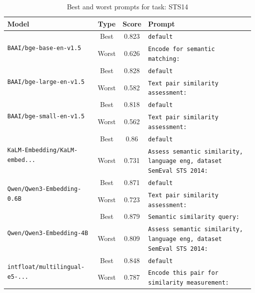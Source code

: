 \begin{table}[t]
\centering
\small
\caption{Best and worst prompts for task: STS14}
\begin{tabular}{|p{}|c|c|p{}|}
\hline
Model & Type & Score & Prompt \\
\hline
\multirow{2}{=}{\raggedright\texttt{BAAI/\allowbreak bge-\allowbreak base-\allowbreak en-\allowbreak v1.5}} & Best & 0.823 & \texttt{default} \\
\cline{2-4}
& Worst & 0.626 & \texttt{Encode for semantic matching:} \\
\hline
\multirow{2}{=}{\raggedright\texttt{BAAI/\allowbreak bge-\allowbreak large-\allowbreak en-\allowbreak v1.5}} & Best & 0.828 & \texttt{default} \\
\cline{2-4}
& Worst & 0.582 & \texttt{Text pair similarity assessment:} \\
\hline
\multirow{2}{=}{\raggedright\texttt{BAAI/\allowbreak bge-\allowbreak small-\allowbreak en-\allowbreak v1.5}} & Best & 0.818 & \texttt{default} \\
\cline{2-4}
& Worst & 0.562 & \texttt{Text pair similarity assessment:} \\
\hline
\multirow{2}{=}{\raggedright\texttt{KaLM-\allowbreak Embedding/\allowbreak KaLM-\allowbreak embed...}} & Best & 0.86 & \texttt{default} \\
\cline{2-4}
& Worst & 0.731 & \texttt{Assess semantic similarity, language eng, dataset SemEval STS 2014:} \\
\hline
\multirow{2}{=}{\raggedright\texttt{Qwen/\allowbreak Qwen3-\allowbreak Embedding-\allowbreak 0.6B}} & Best & 0.871 & \texttt{default} \\
\cline{2-4}
& Worst & 0.723 & \texttt{Text pair similarity assessment:} \\
\hline
\multirow{2}{=}{\raggedright\texttt{Qwen/\allowbreak Qwen3-\allowbreak Embedding-\allowbreak 4B}} & Best & 0.879 & \texttt{Semantic similarity query:} \\
\cline{2-4}
& Worst & 0.809 & \texttt{Assess semantic similarity, language eng, dataset SemEval STS 2014:} \\
\hline
\multirow{2}{=}{\raggedright\texttt{intfloat/\allowbreak multilingual-\allowbreak e5-\allowbreak ...}} & Best & 0.848 & \texttt{default} \\
\cline{2-4}
& Worst & 0.787 & \texttt{Encode this pair for similarity measurement:} \\
\hline
\end{tabular}
\end{table}


